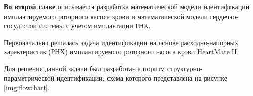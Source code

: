 



\underline{\textbf{Во второй главе}} описывается разработка математической модели идентификации имплантируемого роторного насоса крови и математической модели сердечно-сосудистой системы с учетом имплантации РНК.

Первоначально решалась задача идентификации на основе расходно-напорных характеристик (РНХ) имплантируемого роторного насоса крови HeartMate II. 

Для решения данной задачи был разработан алгоритм структурно-параметрической идентификации, схема которого представлена на рисунке \ref{img:flowchart}.

